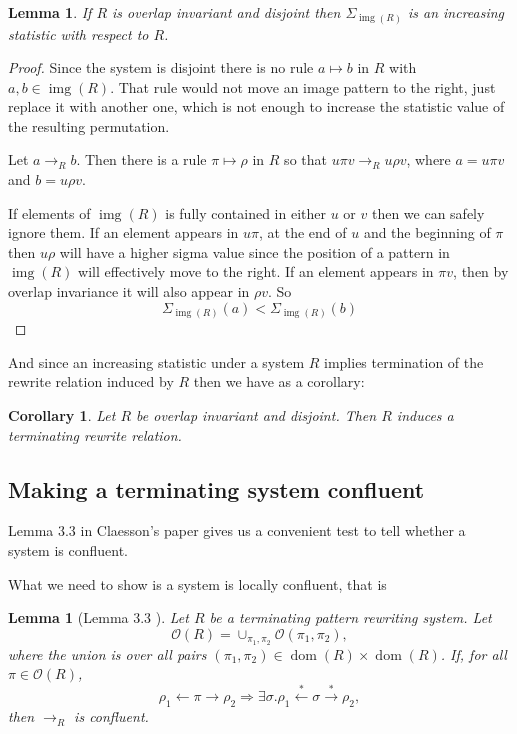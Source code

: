 \documentclass[a4paper, 11pt, english]{article}
\newcommand{\patternrule}{ \mapsto \!}
\newtheorem{lemma}[theorem]{Lemma}
\newtheorem{corollary}[theorem]{Corollary}
\theoremstyle{definition}
\newcommand{\Ocal}{\mathcal{O}}
\newcommand{\from}{\leftarrow}
\newcommand{\tostar}{\stackrel{*}{\to}}
\newcommand{\fromstar}{\stackrel{*}{\from}}
\DeclareMathOperator{\dom}{dom}
\DeclareMathOperator{\img}{img}
\begin{document}
\begin{lemma}
  If $R$ is overlap invariant and disjoint then $\Sigma_{\img(R)}$ is an increasing statistic with respect to $R$. 
\end{lemma}
\begin{proof}
  Since the system is disjoint there is no rule $a \patternrule b$ in $R$ with $a, b \in \img(R)$.
  That rule would not move an image pattern to the right, just replace it with another one, which is
  not enough to increase the statistic value of the resulting permutation.

    Let $a \to_R b$. Then there is a rule $\pi \patternrule \rho$ in
    $R$ so that $u \pi v \to_R u \rho v$, where $a = u \pi v$ and $b =
    u \rho v$. 

    If elements of $\img(R)$ is fully contained in either $u$ or $v$ then we
    can safely ignore them. If an element appears in $u\pi$, at the end of $u$ and the beginning of
    $\pi$ then $u \rho$ will have a higher sigma value since the position of a pattern in $\img(R)$ will
    effectively move to the right. If an element appears in $\pi v$,
    then by overlap invariance it will also appear in $\rho v$.
    So
    \[
        \Sigma_{\img(R)}(a) < \Sigma_{\img(R)}(b)
    \]

\end{proof}

And since an increasing statistic under a system $R$ implies termination of the rewrite relation
induced by $R$ then we have as a corollary:

\begin{corollary}
    Let $R$ be overlap invariant and disjoint. Then $R$ induces a terminating rewrite relation.
\end{corollary}

\subsection{Making a terminating system confluent}
Lemma $3.3$ in Claesson's paper gives us a convenient test to tell whether a system is
confluent. 

What we need to show is a system is locally confluent, that is
\begin{lemma}[Lemma 3.3 \cite{claesson:2021}]
    Let $R$ be a terminating pattern rewriting system. Let 
    \begin{equation*}
        \Ocal(R) = \cup_{\pi_1, \pi_2} \Ocal(\pi_1, \pi_2),
    \end{equation*}
    where the union is over all pairs $(\pi_1, \pi_2) \in \dom(R) \times \dom(R)$. If, for all
    $\pi \in \Ocal(R)$,
    \begin{equation*}
        \rho_1 \from \pi \to \rho_2 \Longrightarrow \exists \sigma. \rho_1 \fromstar \sigma \tostar
        \rho_2,
    \end{equation*}
    then $\to_R$ is confluent.
        
\end{lemma}
\end{document}
